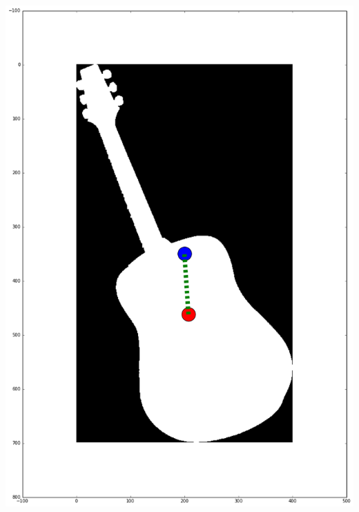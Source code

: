 \documentclass[12pt]{article}
\begin{document}
\includegraphics[scale=0.26]{guitar_centroid.png}
\end{document}
